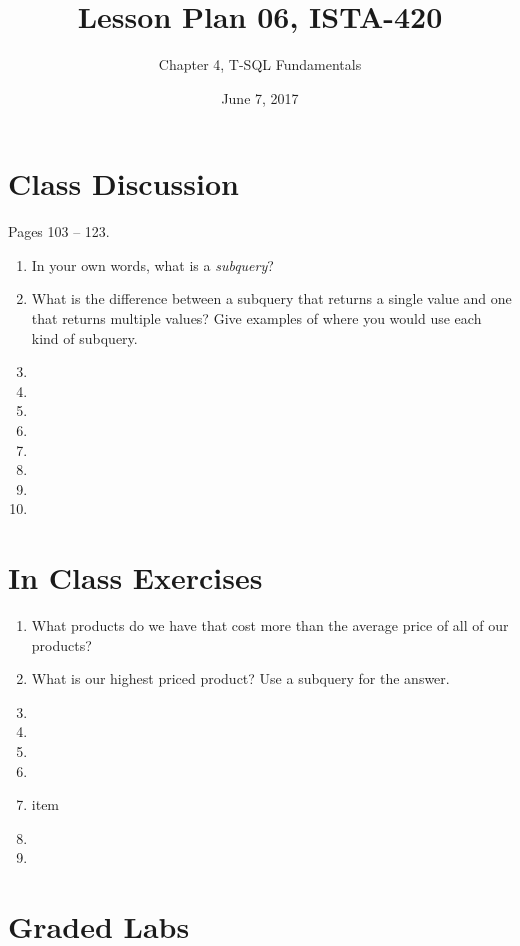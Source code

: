 \documentclass{article}
\title{Lesson Plan 06, ISTA-420}
\author{Chapter 4, T-SQL Fundamentals}
\date{June 7, 2017}
\begin{document}
    

    \maketitle{}

    \section{Class Discussion}

    Pages 103 -- 123.

    \begin{enumerate}
        \item In your own words, what is a \textit{subquery}?
        \item What is the difference between a subquery that returns a single value and one that returns multiple values? Give examples of where you would use each kind of subquery. 
        \item 
        \item 
        \item 
        \item 
        \item 
        \item 
        \item 
        \item 
    \end{enumerate}

    \section{In Class Exercises}

    \begin{enumerate}
        \item What products do we have that cost more than the average price of all of our products?
        \item What is our highest priced product? Use a subquery for the answer.
        \item 
        \item 
        \item 
        \item 
        \item 
        item 
        \item 
        \item 
    \end{enumerate}

    \section{Graded Labs}
\end{document}
